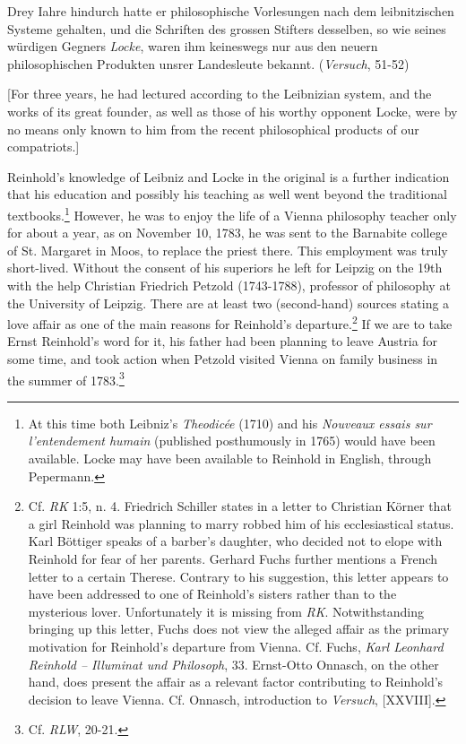 Drey Iahre hindurch hatte er philosophische Vorlesungen nach dem leibnitzischen Systeme gehalten, und die Schriften des grossen Stifters desselben, so wie seines w\"{u}rdigen Gegners \textit{Locke}, waren ihm keineswegs nur aus den neuern philosophischen Produkten unsrer Landesleute bekannt. (\textit{Versuch}, 51{-}52)

[For three years, he had lectured according to the Leibnizian system, and the works of its great founder, as well as those of his worthy opponent Locke, were by no means only known to him from the recent philosophical products of our compatriots.]

Reinhold's knowledge of Leibniz and Locke in the original is a further indication that his education and possibly his teaching as well went beyond the traditional textbooks.\footnote{ At this time both Leibniz's \textit{Theodic\'{e}e} (1710) and his \textit{Nouveaux essais sur l'entendement humain} (published posthumously in 1765) would have been available. Locke may have been available to Reinhold in English, through Pepermann.} However, he was to enjoy the life of a Vienna philosophy teacher only for about a year, as on November 10, 1783, he was sent to the Barnabite college of St. Margaret in Moos, to replace the priest there. This employment was truly short{-}lived. Without the consent of his superiors he left for Leipzig on the 19th with the help Christian Friedrich Petzold (1743{-}1788), professor of philosophy at the University of Leipzig. There are at least two (second{-}hand) sources stating a love affair as one of the main reasons for Reinhold's departure.\footnote{ Cf. \textit{RK} 1:5, n. 4. Friedrich Schiller states in a letter to Christian K\"{o}rner that a girl Reinhold was planning to marry robbed him of his ecclesiastical status. Karl B\"{o}ttiger speaks of a barber's daughter, who decided not to elope with Reinhold for fear of her parents. Gerhard Fuchs further mentions a French letter to a certain Therese. Contrary to his suggestion, this letter appears to have been addressed to one of Reinhold's sisters rather than to the mysterious lover. Unfortunately it is missing from \textit{RK}. Notwithstanding bringing up this letter, Fuchs does not view the alleged affair as the primary motivation for Reinhold's departure from Vienna. Cf. Fuchs, \textit{Karl Leonhard Reinhold {--} Illuminat und Philosoph}, 33. Ernst{-}Otto Onnasch, on the other hand, does present the affair as a relevant factor contributing to Reinhold's decision to leave Vienna. Cf. Onnasch, introduction to \textit{Versuch}, [XXVIII].} If we are to take Ernst Reinhold's word for it, his father had been planning to leave Austria for some time, and took action when Petzold visited Vienna on family business in the summer of 1783.\footnote{ Cf. \textit{RLW}, 20{-}21.} 

